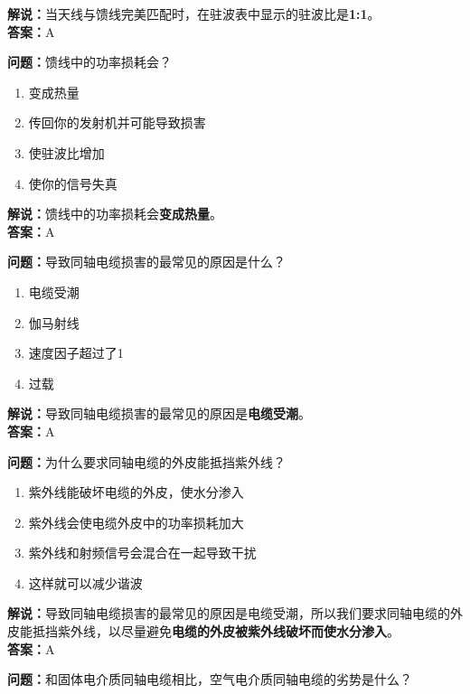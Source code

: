 \textbf{解说：}当天线与馈线完美匹配时，在驻波表中显示的驻波比是\textbf{1:1}。\\\textbf{答案：}A



\textbf{问题：}馈线中的功率损耗会？

\begin{enumerate}[label=\Alph*), leftmargin=1.5cm]
	\item 变成热量
	\item 传回你的发射机并可能导致损害
	\item 使驻波比增加
	\item 使你的信号失真
\end{enumerate}

\textbf{解说：}馈线中的功率损耗会\textbf{变成热量}。\\\textbf{答案：}A



\textbf{问题：}导致同轴电缆损害的最常见的原因是什么？

\begin{enumerate}[label=\Alph*), leftmargin=1.5cm]
	\item 电缆受潮
	\item 伽马射线
	\item 速度因子超过了1
	\item 过载
\end{enumerate}

\textbf{解说：}导致同轴电缆损害的最常见的原因是\textbf{电缆受潮}。\\\textbf{答案：}A



\textbf{问题：}为什么要求同轴电缆的外皮能抵挡紫外线？

\begin{enumerate}[label=\Alph*), leftmargin=1.5cm]
	\item 紫外线能破坏电缆的外皮，使水分渗入
	\item 紫外线会使电缆外皮中的功率损耗加大
	\item 紫外线和射频信号会混合在一起导致干扰
	\item 这样就可以减少谐波
\end{enumerate}

\textbf{解说：}导致同轴电缆损害的最常见的原因是电缆受潮，所以我们要求同轴电缆的外皮能抵挡紫外线，以尽量避免\textbf{电缆的外皮被紫外线破坏而使水分渗入}。\\\textbf{答案：}A%



\textbf{问题：}和固体电介质同轴电缆相比，空气电介质同轴电缆的劣势是什么？

